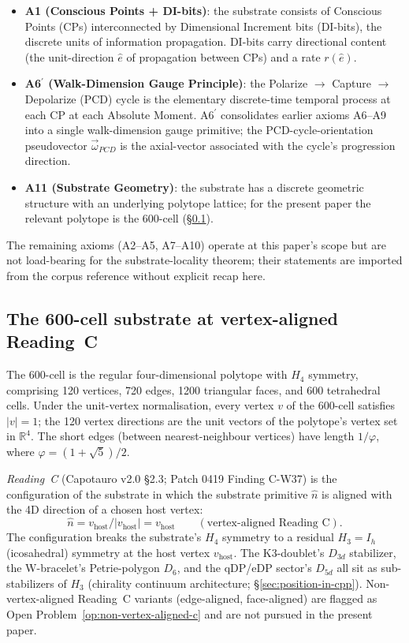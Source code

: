 \documentclass[11pt,letterpaper]{article}
\newcommand{\phig}{\varphi}
\newcommand{\vhost}{v_{\text{host}}}
\newcommand{\omegaPCD}{\vec{\omega}_{PCD}}
\begin{document}
\begin{itemize}[leftmargin=2em]
\item \textbf{A1 (Conscious Points + DI-bits)}: the substrate consists of Conscious Points (CPs) interconnected by Dimensional Increment bits (DI-bits), the discrete units of information propagation. DI-bits carry directional content (the unit-direction $\hat{e}$ of propagation between CPs) and a rate $r(\hat{e})$.
\item \textbf{A6$^{\prime}$ (Walk-Dimension Gauge Principle)}: the Polarize $\to$ Capture $\to$ Depolarize (PCD) cycle is the elementary discrete-time temporal process at each CP at each Absolute Moment. A6$^{\prime}$ consolidates earlier axioms A6--A9 into a single walk-dimension gauge primitive; the PCD-cycle-orientation pseudovector $\omegaPCD$ is the axial-vector associated with the cycle's progression direction.
\item \textbf{A11 (Substrate Geometry)}: the substrate has a discrete geometric structure with an underlying polytope lattice; for the present paper the relevant polytope is the 600-cell (\S\ref{sec:600-cell-reading-c}).
\end{itemize}

The remaining axioms (A2--A5, A7--A10) operate at this paper's scope but are not load-bearing for the substrate-locality theorem; their statements are imported from the corpus reference without explicit recap here.

\subsection{The 600-cell substrate at vertex-aligned Reading~C}
\label{sec:600-cell-reading-c}

The 600-cell is the regular four-dimensional polytope with $H_4$ symmetry, comprising 120 vertices, 720 edges, 1200 triangular faces, and 600 tetrahedral cells. Under the unit-vertex normalisation, every vertex $v$ of the 600-cell satisfies $|v| = 1$; the 120 vertex directions are the unit vectors of the polytope's vertex set in $\mathbb{R}^4$. The short edges (between nearest-neighbour vertices) have length $1/\phig$, where $\phig = (1+\sqrt{5})/2$.

\emph{Reading~C} (Capotauro v2.0 \S2.3; Patch 0419 Finding C-W37) is the configuration of the substrate in which the substrate primitive $\hat{n}$ is aligned with the 4D direction of a chosen host vertex:
\begin{equation}
\hat{n} = \vhost / |\vhost| = \vhost \qquad (\text{vertex-aligned Reading~C}).
\label{eq:reading-c-alignment}
\end{equation}
The configuration breaks the substrate's $H_4$ symmetry to a residual $H_3 = I_h$ (icosahedral) symmetry at the host vertex $\vhost$. The K3-doublet's $D_{3d}$ stabilizer, the W-bracelet's Petrie-polygon $D_6$, and the qDP/eDP sector's $D_{5d}$ all sit as sub-stabilizers of $H_3$ (chirality continuum architecture; \S\ref{sec:position-in-cpp}). Non-vertex-aligned Reading~C variants (edge-aligned, face-aligned) are flagged as Open Problem~\ref{op:non-vertex-aligned-c} and are not pursued in the present paper.
\end{document}
